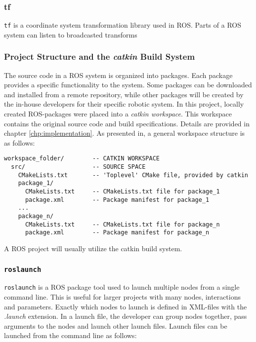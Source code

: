 \subsubsection{tf}

\texttt{tf}\cite{tf_paper} is a coordinate system transformation library used in \ac{ROS}. Parts of a \ac{ROS} system can listen to broadcasted transforms

\subsubsection{Project Structure and the \textit{catkin} Build System}
\label{sec:catkin}
The source code in a \ac{ROS} system is organized into packages. Each package provides a specific functionality to the system. Some packages can be downloaded and installed from a remote repository, while other packages will be created by the in-house developers for their specific robotic system. In this project, locally created ROS-packages were placed into a \textit{catkin workspace}. This workspace contains the  original source code and build specifications. Details are provided in chapter \ref{chp:implementation}. As presented in\cite{ROS_tut_pkg}, a general workspace structure is as follows:

\begin{verbatim}
workspace_folder/        -- CATKIN WORKSPACE
  src/                   -- SOURCE SPACE
    CMakeLists.txt       -- 'Toplevel' CMake file, provided by catkin
    package_1/
      CMakeLists.txt     -- CMakeLists.txt file for package_1
      package.xml        -- Package manifest for package_1
    ...
    package_n/
      CMakeLists.txt     -- CMakeLists.txt file for package_n
      package.xml        -- Package manifest for package_n
\end{verbatim}

A \ac{ROS} project will usually utilize the catkin build system.

\subsubsection{\texttt{roslaunch}}

\texttt{roslaunch}\cite{ROS_launch} is a \ac{ROS} package tool used to launch multiple nodes from a single command line. This is useful for larger projects with many nodes, interactions and parameters. Exactly which nodes to launch is defined in XML-files with the \textit{.launch} extension. In a launch file, the developer can group nodes together, pass arguments to the nodes and launch other launch files. Launch files can be launched from the command line as follows:

